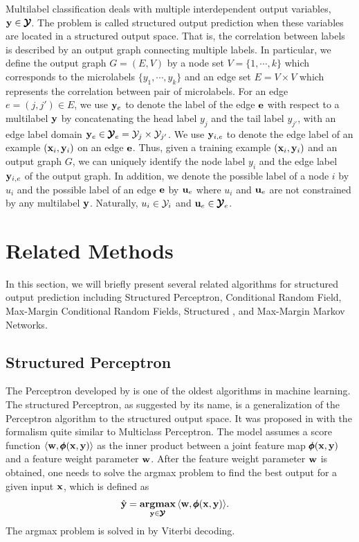 {Multilabel classification deals with multiple interdependent output variables, $\mathbf {y}\in\pmb {\mathcal{Y}}$.
The problem is called {structured output prediction} when these variables are located in a structured output space.
That is, the correlation between labels is described by an {output graph} connecting multiple labels.
In particular, we define the output graph $G=(E,V)$ by a node set $V=\{1,\cdots,k\}$ which corresponds to the microlabels $\{y_1,\cdots,y_k\}$ and an edge set $E=V\times V$ which represents the correlation between pair of microlabels.
For an edge $e=(j,j')\in E$, we use $\mathbf {y}_e$ to denote the label of the edge $\mathbf {e}$ with respect to a multilabel $\mathbf {y}$ by concatenating the head label $y_j$ and the tail label $y_{j'}$, with an edge label domain $\mathbf {y}_e\in\pmb {\mathcal{Y}}_e=\mathcal{Y}_j\times\mathcal{Y}_{j'}$.
We use $\mathbf {y}_{i,e}$ to denote the edge label of an example $(\mathbf {x}_i,\mathbf {y}_i)$ on an edge $\mathbf {e}$.
Thus, given a training example $(\mathbf {x}_i,\mathbf {y}_i)$ and an output graph $G$, we can uniquely identify the node label $y_i$ and the edge label $\mathbf {y}_{i,e}$ of the output graph.
In addition, we denote the possible label of a node $i$ by $u_i$ and the possible label of an edge $\mathbf {e}$ by $\mathbf {u}_{e}$ where $u_i$ and $\mathbf {u}_{e}$ are not constrained by any multilabel $\mathbf {y}$.
Naturally, $u_i\in\mathcal{Y}_i$ and $\mathbf {u}_e\in\pmb {\mathcal{Y}}_e$.



%
%
\section{Related Methods}

In this section, we will briefly present several related algorithms for structured output prediction including Structured Perceptron, Conditional Random Field, Max-Margin Conditional Random Fields, Structured \svm, and Max-Margin Markov Networks.



%
%
\subsection{Structured Perceptron}

The Perceptron developed by \citet{Rosenblatt58} is one of the oldest algorithms in machine learning.
The structured Perceptron, as suggested by its name, is a generalization of the Perceptron algorithm to the structured output space.
It was proposed in \citep{collins02a, collins02b} with the formalism quite similar to Multiclass Perceptron. 
The model assumes a score function $\langle \mathbf {w}, \pmb \phi(\mathbf {x},\mathbf {y}) \rangle$ as the inner product between a joint feature map $\pmb \phi(\mathbf {x},\mathbf {y})$ and a feature weight parameter $\mathbf {w}$.
After the feature weight parameter $\mathbf {w}$ is obtained, one needs to solve the {argmax} problem to find the best output for a given input $\mathbf {x}$, which is defined as
\begin{align}
	\hat{\mathbf {y}} = \underset{\mathbf {y}\in\pmb {\mathcal{Y}}}{\textbf{argmax}} &\, \langle \mathbf {w}, \pmb \phi(\mathbf {x},\mathbf {y}) \rangle. \label{sp_inference}
\end{align}
The argmax problem is solved in \citep{collins02a} by Viterbi decoding.

}
